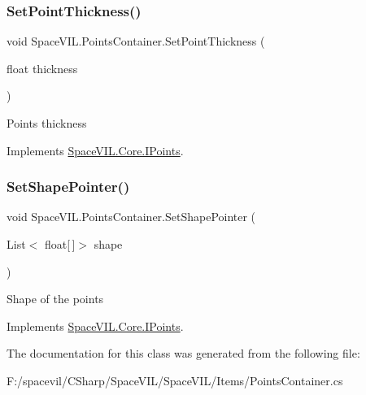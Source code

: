 \subsubsection{\texorpdfstring{Set\+Point\+Thickness()}{SetPointThickness()}}
{\footnotesize\ttfamily void Space\+V\+I\+L.\+Points\+Container.\+Set\+Point\+Thickness (\begin{DoxyParamCaption}\item[{float}]{thickness }\end{DoxyParamCaption})\hspace{0.3cm}{\ttfamily [inline]}}



Points thickness 



Implements \mbox{\hyperlink{interface_space_v_i_l_1_1_core_1_1_i_points}{Space\+V\+I\+L.\+Core.\+I\+Points}}.

\mbox{\label{class_space_v_i_l_1_1_points_container_a0694fefae0c13a4006608adc71c9f706}} 
\subsubsection{\texorpdfstring{Set\+Shape\+Pointer()}{SetShapePointer()}}
{\footnotesize\ttfamily void Space\+V\+I\+L.\+Points\+Container.\+Set\+Shape\+Pointer (\begin{DoxyParamCaption}\item[{List$<$ float\mbox{[}$\,$\mbox{]}$>$}]{shape }\end{DoxyParamCaption})\hspace{0.3cm}{\ttfamily [inline]}}



Shape of the points 



Implements \mbox{\hyperlink{interface_space_v_i_l_1_1_core_1_1_i_points}{Space\+V\+I\+L.\+Core.\+I\+Points}}.



The documentation for this class was generated from the following file\+:\begin{DoxyCompactItemize}
\item 
F\+:/spacevil/\+C\+Sharp/\+Space\+V\+I\+L/\+Space\+V\+I\+L/\+Items/Points\+Container.\+cs\end{DoxyCompactItemize}
